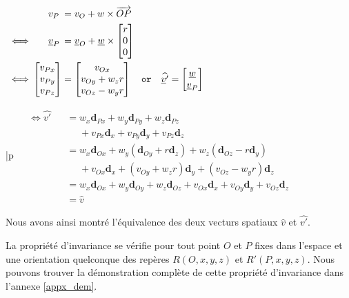 \vspace{0.3cm}
{%
\(
\begin{alignedat}{3}
  & &&\phantom{xxx} v_{P} &&= v_{O} + w \times \overrightarrow{OP} \\
  \vspace{0.5cm}
  &\iff &&\phantom{xxx} \underline{v}_{P}
  &&=
  \underline{v}_{O}+\underline{w}\times
  \begin{bmatrix}
    r\\
    0\\
    0
  \end{bmatrix} \\
  \vspace{0.5cm}
  &\iff
  &&\begin{bmatrix}
    v_{Px} \\
    v_{Py} \\
    v_{Pz}
  \end{bmatrix}
  &&=
  \begin{bmatrix}
    v_{Ox}\\
    v_{Oy}+w_{z}r\\
    v_{Oz}-w_{y}r
  \end{bmatrix}
  \quad \texttt{or} \quad
  \widehat{\underline{v}'}
  =
  \begin{bmatrix}
    \underline{w} \\
    \underline{v}_{P}
  \end{bmatrix}
\end{alignedat}
\)}
{%
\begin{tabular}{|p{\textwidth}}
\(\begin{alignedat}{2}
  &\iff
  \widehat{v'} &&= w_{x}\textbf{d}_{Px} + w_{y}\textbf{d}_{Py} + w_{z}\textbf{d}_{Pz} \\
  &            &&\phantom{{}={}} + v_{Px}\textbf{d}_{x} + v_{Py}\textbf{d}_{y} + v_{Pz}\textbf{d}_{z} \\
  &            &&= w_{x}\textbf{d}_{Ox} + w_{y}(\textbf{d}_{Oy}+r\textbf{d}_{z}) + w_{z}(\textbf{d}_{Oz}-r\textbf{d}_{y}) \\
  &            &&\phantom{{}={}} + v_{Ox}\textbf{d}_{x} + (v_{Oy}+w_{z}r)\textbf{d}_{y} + (v_{Oz}-w_{y}r)\textbf{d}_{z} \\
  &            &&= w_{x}\textbf{d}_{Ox} + w_{y}\textbf{d}_{Oy} + w_{z}\textbf{d}_{Oz} + v_{Ox}\textbf{d}_{x} + v_{Oy}\textbf{d}_{y} + v_{Oz}\textbf{d}_{z} \\
  &            &&= \widehat{v}
\end{alignedat}\)
\end{tabular}
}
{}
\vspace{0.3cm}

Nous avons ainsi montré l'équivalence des deux vecturs spatiaux $\widehat{v}$ et $\widehat{v'}$.

La propriété d'invariance se vérifie pour tout point $O$ et $P$ fixes dans l'espace et une orientation quelconque des repères $R(O,x,y,z)$ et $R'(P,x,y,z)$. Nous pouvons trouver la démonstration complète de cette propriété d'invariance dans l'annexe \ref{appx_dem}.






